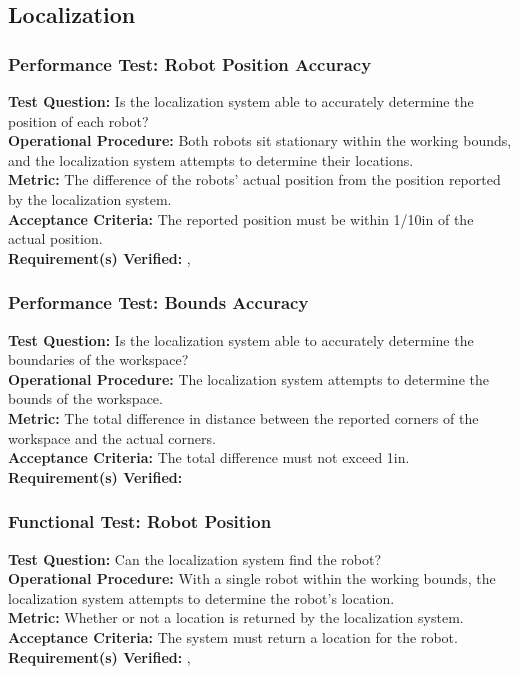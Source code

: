 
\subsection{Localization}
\label{sec:verification_localization}

\subsubsection{Performance Test: Robot Position Accuracy}
\label{test:localization_pt_accuracy}
\textbf{Test Question:} Is the localization system able to accurately determine the position of each robot?\\
\textbf{Operational Procedure:} Both robots sit stationary within the working bounds, and the localization system attempts to determine their locations.\\
\textbf{Metric:} The difference of the robots' actual position from the position reported by the localization system. \\
\textbf{Acceptance Criteria:} The reported position must be within 1/10in of the actual position.\\
\textbf{Requirement(s) Verified:} , 

\subsubsection{Performance Test: Bounds Accuracy}
\label{test:localization_pt_bounds}
\textbf{Test Question:} Is the localization system able to accurately determine the boundaries of the workspace?\\
\textbf{Operational Procedure:} The localization system attempts to determine the bounds of the workspace.\\
\textbf{Metric:} The total difference in distance between the reported corners of the workspace and the actual corners.\\
\textbf{Acceptance Criteria:} The total difference must not exceed 1in.\\
\textbf{Requirement(s) Verified:} 

\subsubsection{Functional Test: Robot Position}
\label{test:localization_ft_robopos}
\textbf{Test Question:} Can the localization system find the robot?\\
\textbf{Operational Procedure:} With a single robot within the working bounds, the localization system attempts to determine the robot's location.\\
\textbf{Metric:} Whether or not a location is returned by the localization system.\\
\textbf{Acceptance Criteria:} The system must return a location for the robot. \\
\textbf{Requirement(s) Verified:} , 

